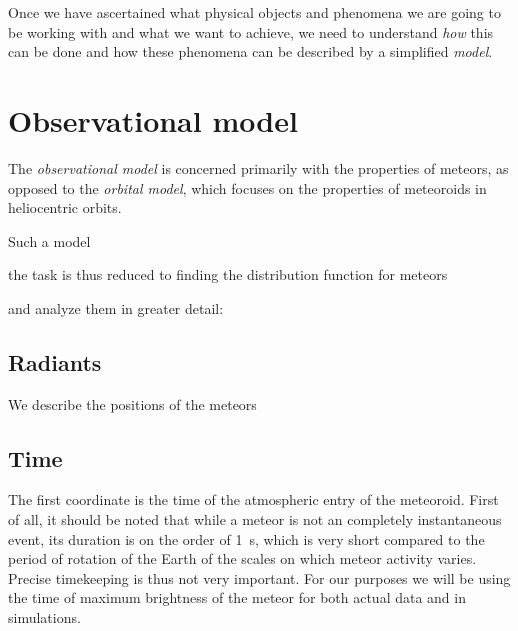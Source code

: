 
Once we have ascertained what physical objects and phenomena we are going to be working with and what we want to achieve,
we need to understand \emph{how} this can be done and how these phenomena can be described by a simplified \emph{model}.


\section{Observational model} \label{m}
    The \emph{observational model} is concerned primarily with the properties of meteors,
    as opposed to the \emph{orbital model}, which focuses on the properties of meteoroids in heliocentric orbits.

    Such a model 

    the task is thus reduced to finding the distribution function for meteors

    and analyze them in greater detail:


    \subsection{Radiants} \label{msr}
        We describe the positions of the meteors


    \subsection{Time} \label{mst}
        The first coordinate is the time of the atmospheric entry of the meteoroid.
        First of all, it should be noted that while a meteor is not an completely instantaneous event,
        its duration is on the order of \SI{1}{\second}, which is very short compared to the
        period of rotation of the Earth of the scales on which meteor activity varies.
        Precise timekeeping is thus not very important.
        For our purposes we will be using the time of maximum brightness
        of the meteor for both actual data and in simulations.

